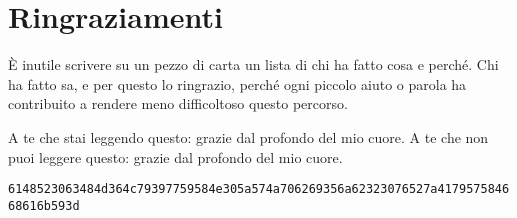 \chapter*{Ringraziamenti}
È inutile scrivere su un pezzo di carta un lista di chi ha fatto cosa e perché.\newline
Chi ha fatto sa, e per questo lo ringrazio, perché ogni piccolo aiuto o parola ha contribuito a rendere meno difficoltoso questo percorso.\newline\newline

A te che stai leggendo questo: grazie dal profondo del mio cuore.\newline
A te che non puoi leggere questo: grazie dal profondo del mio cuore.

\vfill
\small{\texttt{6148523063484d364c79397759584e305a574a706269356a62323076527a417957584668616b593d}}
